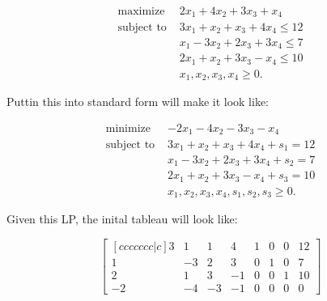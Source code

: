 \documentclass[12pt]{extarticle}
\theoremstyle{definition}
\begin{document}
\begin{problem} 

	\begin{align*}
	\text{maximize } &2x_1+4x_2+3x_3+x_4\\
	\text{subject to } &3x_1+x_2+x_3+4x_4\leq 12\\
	&x_1-3x_2+2x_3+3x_4\leq 7\\
	&2x_1+x_2+3x_3-x_4\leq 10\\
	&x_1, x_2, x_3, x_4\geq 0.
	\end{align*}

	Puttin this into standard form will make it look like:

	\begin{align*}
	\text{minimize } &-2x_1-4x_2-3x_3-x_4\\
	\text{subject to } &3x_1+x_2+x_3+4x_4+s_1 = 12\\
	&x_1-3x_2+2x_3+3x_4+s_2 = 7\\
	&2x_1+x_2+3x_3-x_4+s_3 = 10\\
	&x_1, x_2, x_3, x_4, s_1, s_2, s_3\geq 0.
	\end{align*}

	Given this LP, the inital tableau will look like:

	$$\begin{bmatrix}[ccccccc|c] 3&1&1&4&1&0&0&12\\ 1&-3&2&3&0&1&0&7\\ 2&1&3&-1&0&0&1&10\\ -2&-4&-3&-1&0&0&0&0 \end{bmatrix}$$



\end{problem}


\small


\end{document}
